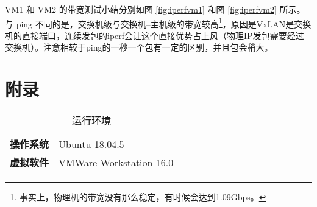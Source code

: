     VM1 和 VM2 的带宽测试小结分别如图 \ref{fig:iperfvm1} 和图 \ref{fig:iperfvm2} 所示。与 ping 不同的是，交换机级与交换机--主机级的带宽较高\footnote{事实上，物理机的带宽没有那么稳定，有时候会达到1.09Gbps。}，原因是VxLAN是交换机的直接端口，连续发包的iperf会让这个直接优势占上风（物理IP发包需要经过交换机）。注意相较于ping的一秒一个包有一定的区别，并且包会稍大。

    \section*{附录}

    \begin{table}[H]
        \centering
        \caption{运行环境}\label{tab:env}
        \begin{tabular}{>{\bfseries}cl}
            \toprule
            操作系统 & Ubuntu 18.04.5 \\
            虚拟软件 & VMWare Workstation 16.0\\
            \bottomrule
        \end{tabular}
    \end{table}

    

